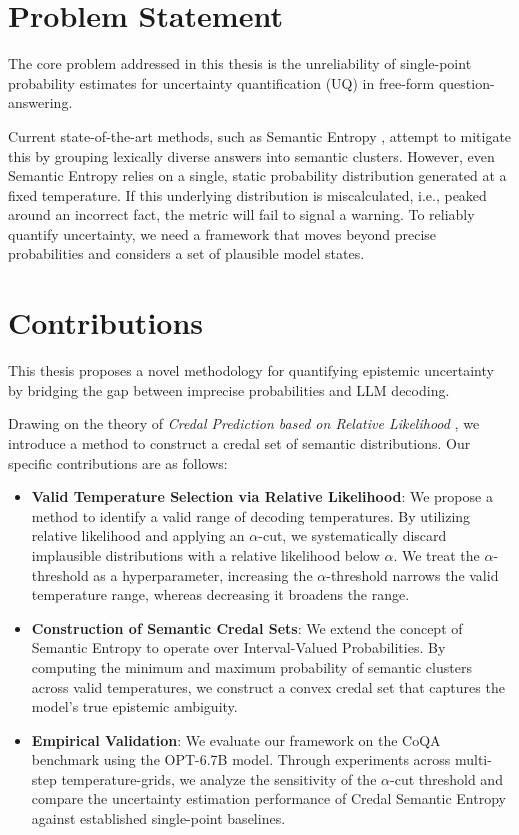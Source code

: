 \section{Problem Statement}
\label{sec:intro:problem_statement}
The core problem addressed in this thesis is the unreliability of
single-point probability estimates for uncertainty quantification (UQ)
in free-form question-answering.

Current state-of-the-art methods, such as Semantic Entropy
\parencite{kuhn2023semanticuncertaintylinguisticinvariances},
attempt to mitigate this by grouping lexically diverse answers
into semantic clusters. However, even Semantic Entropy relies on a
single, static probability distribution generated at a fixed 
temperature. If this underlying distribution is miscalculated,
i.e., peaked around an incorrect fact, the metric will fail to
signal a warning.
To reliably quantify uncertainty, we need a framework that moves 
beyond precise probabilities and considers a set of plausible 
model states.

\section{Contributions}
\label{sec:intro:contributions}
This thesis proposes a novel methodology for quantifying epistemic
uncertainty by bridging the gap between imprecise probabilities
and LLM decoding.

Drawing on the theory of \textit{Credal Prediction based on Relative 
Likelihood} \parencite{löhr2025credalpredictionbasedrelative}, we 
introduce a method to construct a credal set 
of semantic distributions. Our specific contributions are as follows: 

\begin{itemize}
    \item \textbf{Valid Temperature Selection via Relative Likelihood}:
	We propose a method to identify a valid range of 
	decoding temperatures. By utilizing relative likelihood and 
	applying an $\alpha$-cut, we systematically 
	discard implausible distributions with a relative likelihood
	below $\alpha$. We treat the $\alpha$-threshold as a 
	hyperparameter, increasing the $\alpha$-threshold narrows the
	valid temperature range, whereas decreasing it broadens the range.

    \item \textbf{Construction of Semantic Credal Sets}:
	We extend the concept of Semantic Entropy to operate over 
	Interval-Valued Probabilities. By computing the minimum and 
	maximum probability of semantic clusters across valid 
	temperatures, we construct a convex credal set that captures
	the model's true epistemic ambiguity. 

    \item \textbf{Empirical Validation}:
	We evaluate our framework on the CoQA benchmark using the
	OPT-6.7B model. Through experiments across multi-step 
	temperature-grids, we analyze the sensitivity of the 
	$\alpha$-cut threshold and compare the uncertainty 
	estimation performance of Credal Semantic Entropy 
	against	established single-point baselines.
\end{itemize}


